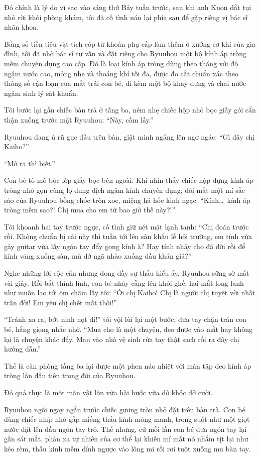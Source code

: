 ﻿\documentclass[../main.tex]{subfiles}
\begin{document}
Đó chính là lý do vì sao vào sáng thứ Bảy tuần trước, sau khi anh Kuon dắt tụi nhỏ rời khỏi phòng khám, tôi đã cố tình nán lại phía sau để gặp riêng vị bác sĩ nhãn khoa.

Bằng số tiền tiêu vặt tích cóp từ khoản phụ cấp làm thêm ở xưởng cơ khí của gia đình, tôi đã nhờ bác sĩ tư vấn và đặt riêng cho Ryuuhou một bộ kính áp tròng mềm chuyên dụng cao cấp. Đó là loại kính áp tròng dùng theo tháng với độ ngậm nước cao, mỏng nhẹ và thoáng khí tối đa, được đo cắt chuẩn xác theo thông số cận loạn của mắt trái con bé, đi kèm một bộ khay đựng và chai nước ngâm sinh lý sát khuẩn.

Tôi bước lại gần chiếc bàn trà ở tầng ba, ném nhẹ chiếc hộp nhỏ bọc giấy gói cẩn thận xuống trước mặt Ryuuhou: ``Này, cầm lấy.''

Ryuuhou đang ủ rũ gục đầu trên bàn, giật mình ngẩng lên ngơ ngác: ``Gì đây chị Kaiho?''

``Mở ra thì biết.''

Con bé tò mò bóc lớp giấy bọc bên ngoài. Khi nhìn thấy chiếc hộp đựng kính áp tròng nhỏ gọn cùng lọ dung dịch ngâm kính chuyên dụng, đôi mắt một mí sắc sảo của Ryuuhou bỗng chốc tròn xoe, miệng há hốc kinh ngạc: ``Kính\dots\ kính áp tròng mềm sao?! Chị mua cho em từ bao giờ thế này?!''

Tôi khoanh hai tay trước ngực, cố tình giữ nét mặt lạnh tanh: ``Chị đoán trước rồi. Không chuẩn bị cái này thì tuần tới lên sân khấu lễ hội trường, em tính vừa gảy guitar vừa lấy ngón tay đẩy gọng kính à? Hay tính nhảy cho đã đời rồi để kính văng xuống sàn, mù dở ngã nhào xuống đầu khán giả?''

Nghe những lời cộc cằn nhưng đong đầy sự thấu hiểu ấy, Ryuuhou sững sờ mất vài giây. Rồi bất thình lình, con bé nhảy cẫng lên khỏi ghế, hai mắt long lanh như muốn lao tới ôm chầm lấy tôi: ``Ôi chị Kaiho! Chị là người chị tuyệt vời nhất trần đời! Em yêu chị chết mất thôi!''

``Tránh xa ra, bớt nịnh nọt đi!'' tôi vội lùi lại một bước, đưa tay chặn trán con bé, hắng giọng nhắc nhở. ``Mua cho là một chuyện, đeo được vào mắt hay không lại là chuyện khác đấy. Mau vào nhà vệ sinh rửa tay thật sạch rồi ra đây chị hướng dẫn.''

Thế là căn phòng tầng ba lại được một phen náo nhiệt với màn tập đeo kính áp tròng lần đầu tiên trong đời của Ryuuhou.

Đó quả thực là một màn vật lộn vừa hài hước vừa dở khóc dở cười.

Ryuuhou ngồi ngay ngắn trước chiếc gương tròn nhỏ đặt trên bàn trà. Con bé dùng chiếc nhíp nhỏ gắp miếng thấu kính mỏng manh, trong suốt như một giọt nước đặt lên đầu ngón tay trỏ. Thế nhưng, cứ mỗi lần con bé đưa ngón tay lại gần sát mắt, phản xạ tự nhiên của cơ thể lại khiến mí mắt nó nhắm tịt lại như kéo rèm, thấu kính mềm dính ngược vào lông mi rồi rơi tuột xuống mu bàn tay.
\end{document}
